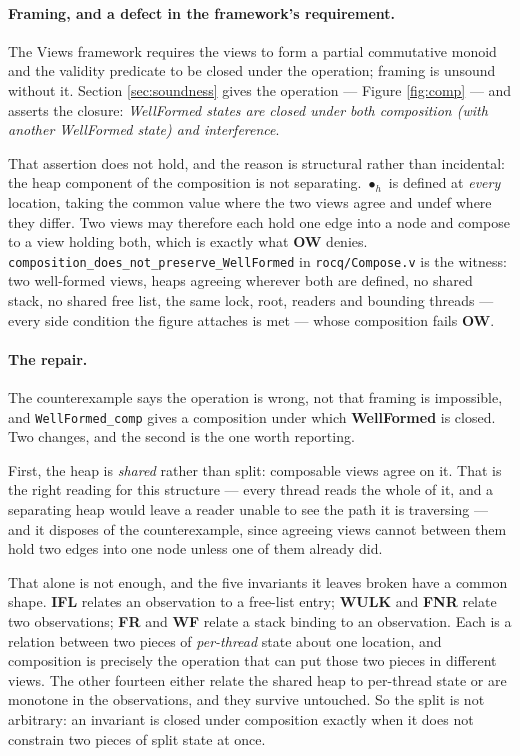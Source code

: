 \paragraph{Framing, and a defect in the framework's requirement.}  The Views framework requires the
views to form a partial commutative monoid and the validity predicate to be
closed under the operation; framing is unsound without it.  Section
\ref{sec:soundness} gives the operation --- Figure \ref{fig:comp} --- and asserts
the closure: \emph{WellFormed states are closed under both composition (with
another WellFormed state) and interference}.

That assertion does not hold, and the reason is structural rather than
incidental: the heap component of the composition is not separating.
$\bullet_h$ is defined at \emph{every} location, taking the common value where
the two views agree and \textsf{undef} where they differ.  Two views may
therefore each hold one edge into a node and compose to a view holding both,
which is exactly what \textbf{OW} denies.
\texttt{composition\_does\_not\_preserve\_WellFormed} in
\texttt{rocq/Compose.v} is the witness: two well-formed views, heaps agreeing
wherever both are defined, no shared stack, no shared free list, the same lock,
root, readers and bounding threads --- every side condition the figure attaches
is met --- whose composition fails \textbf{OW}.

\paragraph{The repair.}  The counterexample says the operation is wrong, not
that framing is impossible, and \texttt{WellFormed\_comp} gives a composition
under which \textbf{WellFormed} is closed.  Two changes, and the second is the
one worth reporting.

First, the heap is \emph{shared} rather than split: composable views agree on
it.  That is the right reading for this structure --- every thread reads the
whole of it, and a separating heap would leave a reader unable to see the path
it is traversing --- and it disposes of the counterexample, since agreeing views
cannot between them hold two edges into one node unless one of them already
did.

That alone is not enough, and the five invariants it leaves broken have a common
shape.  \textbf{IFL} relates an observation to a free-list entry; \textbf{WULK}
and \textbf{FNR} relate two observations; \textbf{FR} and \textbf{WF} relate a
stack binding to an observation.  Each is a relation between two pieces of
\emph{per-thread} state about one location, and composition is precisely the
operation that can put those two pieces in different views.  The other fourteen
either relate the shared heap to per-thread state or are monotone in the
observations, and they survive untouched.  So the split is not arbitrary: an
invariant is closed under composition exactly when it does not constrain two
pieces of split state at once.

